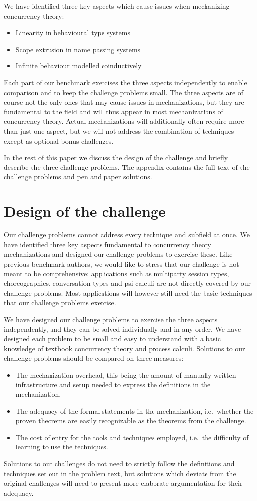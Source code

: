 \documentclass[adraft,copyright,creativecommons]{eptcs}
\begin{document}
We have identified three key aspects which cause issues when mechanizing concurrency theory:
\begin{itemize}
\item Linearity in behavioural type systems
\item Scope extrusion in name passing systems
\item Infinite behaviour modelled coinductively
\end{itemize}
Each part of our benchmark exercises the three aspects independently to enable comparison and to keep the challenge problems small.
The three aspects are of course not the only ones that may cause issues in mechanizations, but they are fundamental to the field and will thus appear in most mechanizations of concurrency theory.
Actual mechanizations will additionally often require more than just one aspect, but we will not address the combination of techniques except as optional bonus challenges.

In the rest of this paper we discuss the design of the challenge and briefly describe the three challenge problems.
The appendix contains the full text of the challenge problems and pen and paper solutions.

\section{Design of the challenge}
Our challenge problems cannot address every technique and subfield at once.
We have identified three key aspects fundamental to concurrency theory mechanizations and designed our challenge problems to exercise these.
Like previous benchmark authors, we would like to stress that our challenge is not meant to be comprehensive: applications such as multiparty session types, choreographies, conversation types and psi-calculi are not directly covered by our challenge problems.
Most applications will however still need the basic techniques that our challenge problems exercise.

We have designed our challenge problems to exercise the three aspects independently, and they can be solved individually and in any order.
We have designed each problem to be small and easy to understand with a basic knowledge of textbook concurrency theory and process calculi.
Solutions to our challenge problems should be compared on three measures:
\begin{itemize}
\item The mechanization overhead, this being the amount of manually written infrastructure and setup needed to express the definitions in the mechanization.
\item The adequacy of the formal statements in the mechanization, i.e.\ whether the proven theorems are easily recognizable as the theorems from the challenge.
\item The cost of entry for the tools and techniques employed, i.e.\ the difficulty of learning to use the techniques.
\end{itemize}
Solutions to our challenges do not need to strictly follow the definitions and techniques set out in the problem text, but solutions which deviate from the original challenges will need to present more elaborate argumentation for their adequacy.
\end{document}
